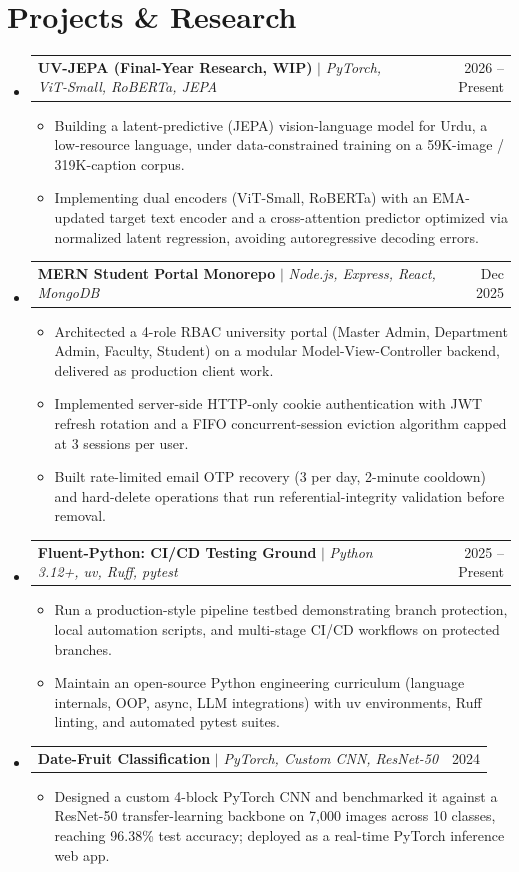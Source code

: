 \documentclass[letterpaper,11pt]{article}
\makeatletter
\newcommand{\resumeItem}[1]{
  \item\small{
    {#1 \vspace{-2pt}}
  }
}
\newcommand{\resumeProjectHeading}[2]{
    \item
    \begin{tabular*}{0.97\textwidth}{l@{\extracolsep{\fill}}r}
      \small#1 & #2 \\
    \end{tabular*}\vspace{-7pt}
}
\newcommand{\resumeSubHeadingListStart}{\begin{itemize}[leftmargin=0.15in, label={}]}
\newcommand{\resumeSubHeadingListEnd}{\end{itemize}}
\newcommand{\resumeItemListStart}{\begin{itemize}}
\newcommand{\resumeItemListEnd}{\end{itemize}\vspace{-5pt}}
\makeatother
\begin{document}
\section{Projects \& Research}
    \resumeSubHeadingListStart
      \resumeProjectHeading
          {\textbf{UV-JEPA (Final-Year Research, WIP)} $|$ \emph{PyTorch, ViT-Small, RoBERTa, JEPA}}{2026 -- Present}
          \resumeItemListStart
            \resumeItem{Building a latent-predictive (JEPA) vision-language model for Urdu, a low-resource language, under data-constrained training on a 59K-image / 319K-caption corpus.}
            \resumeItem{Implementing dual encoders (ViT-Small, RoBERTa) with an EMA-updated target text encoder and a cross-attention predictor optimized via normalized latent regression, avoiding autoregressive decoding errors.}
          \resumeItemListEnd
          
      \resumeProjectHeading
          {\textbf{MERN Student Portal Monorepo} $|$ \emph{Node.js, Express, React, MongoDB}}{Dec 2025}
          \resumeItemListStart
            \resumeItem{Architected a 4-role RBAC university portal (Master Admin, Department Admin, Faculty, Student) on a modular Model-View-Controller backend, delivered as production client work.}
            \resumeItem{Implemented server-side HTTP-only cookie authentication with JWT refresh rotation and a FIFO concurrent-session eviction algorithm capped at 3 sessions per user.}
            \resumeItem{Built rate-limited email OTP recovery (3 per day, 2-minute cooldown) and hard-delete operations that run referential-integrity validation before removal.}
          \resumeItemListEnd
          
      \resumeProjectHeading
          {\textbf{Fluent-Python: CI/CD Testing Ground} $|$ \emph{Python 3.12+, uv, Ruff, pytest}}{2025 -- Present}
          \resumeItemListStart
            \resumeItem{Run a production-style pipeline testbed demonstrating branch protection, local automation scripts, and multi-stage CI/CD workflows on protected branches.}
            \resumeItem{Maintain an open-source Python engineering curriculum (language internals, OOP, async, LLM integrations) with uv environments, Ruff linting, and automated pytest suites.}
          \resumeItemListEnd
          
      \resumeProjectHeading
          {\textbf{Date-Fruit Classification} $|$ \emph{PyTorch, Custom CNN, ResNet-50}}{2024}
          \resumeItemListStart
            \resumeItem{Designed a custom 4-block PyTorch CNN and benchmarked it against a ResNet-50 transfer-learning backbone on 7,000 images across 10 classes, reaching 96.38\% test accuracy; deployed as a real-time PyTorch inference web app.}
          \resumeItemListEnd
    \resumeSubHeadingListEnd
\end{document}
